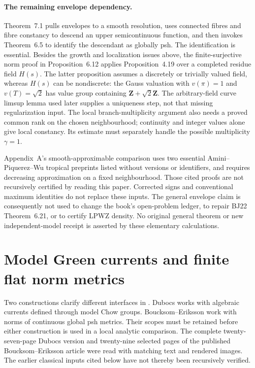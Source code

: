 \paragraph{The remaining envelope dependency.}
Theorem~7.1 pulls envelopes to a smooth resolution, uses connected
fibres and fibre constancy to descend an upper semicontinuous
function, and then invokes Theorem~6.5 to identify the descendant as
globally psh. The identification is essential. Besides the growth
and localization issues above, the finite-surjective norm proof
in Proposition~6.12 applies Proposition~4.19 over a completed residue
field \(H(s)\). The latter proposition assumes a discretely or
trivially valued field, whereas \(H(s)\) can be nondiscrete:
the Gauss valuation with \(v(\pi)=1\) and \(v(T)=\sqrt2\) has value
group containing \(\mathbf Z+\sqrt2\mathbf Z\).
The arbitrary-field curve limsup lemma used later supplies a
uniqueness step, not that missing regularization input.
The local branch-multiplicity argument also needs a proved common
rank on the chosen neighbourhood; continuity and integer values
alone give local constancy. Its estimate must separately handle
the possible multiplicity \(\gamma=1\).

Appendix~A's smooth-approximable comparison uses two essential
Amini--Piquerez--Wu tropical preprints listed without versions or
identifiers, and requires decreasing approximation on a fixed
neighbourhood. Those cited proofs are not recursively certified by
reading this paper. Corrected signs and conventional maximum
identities do not replace these inputs. The general envelope claim
is consequently not used to change the book's open-problem ledger,
to repair BJ22 Theorem~6.21, or to certify LPWZ density.
No original general theorem or new independent-model receipt is
asserted by these elementary calculations.

\section{Model Green currents and finite flat norm metrics}
\label{sec:appL-model-green-norm-scope}

Two constructions clarify different interfaces in
.
Dubocs \cite{Dubocs26GreenV1} works with algebraic currents defined
through model Chow groups. Boucksom--Eriksson
\cite[Proposition~8.22]{BE21} work with norms of continuous global
psh metrics. Their scopes must be retained before either construction
is used in a local analytic comparison. The complete twenty-seven-page
Dubocs version and twenty-nine selected pages of the published
Boucksom--Eriksson article were read with matching text and rendered
images. The earlier classical inputs cited below have not thereby
been recursively verified.

